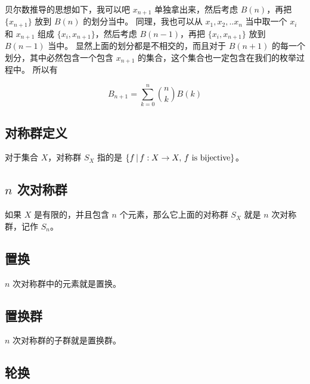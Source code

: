 贝尔数推导的思想如下，我可以吧 $x_{n+1}$ 单独拿出来，然后考虑 $B(n)$，再把 $\{ x_{n+1} \}$ 放到 $B(n)$ 的划分当中。
同理，我也可以从 $x_1, x_2, .. x_n$ 当中取一个 $x_i$ 和 $x_{n+1}$ 组成 $\{ x_i, x_{n+1} \}$，然后考虑 $B(n-1)$，再把 $\{ x_i, x_{n+1}\}$ 放到 $B(n-1)$ 当中。
显然上面的划分都是不相交的，而且对于 $B(n+1)$ 的每一个划分，其中必然包含一个包含 $x_{n+1}$ 的集合，这个集合也一定包含在我们的枚举过程中。
所以有

\[
B_{n+1} = \sum_{k=0}^{n} \binom{n}{k} B(k)
\]

\subsection{对称群定义}

对于集合 $X$，对称群 $S_X$ 指的是 $\{ f \,\vert\, f: X \to X,\, f\text{ is bijective}\}$。

\subsection{ $n$ 次对称群}

如果 $X$ 是有限的，并且包含 $n$ 个元素，那么它上面的对称群 $S_X$ 就是 $n$ 次对称群，记作 $S_n$。

\subsection{置换}

$n$ 次对称群中的元素就是置换。

\subsection{置换群}

$n$ 次对称群的子群就是置换群。


\subsection{轮换}



